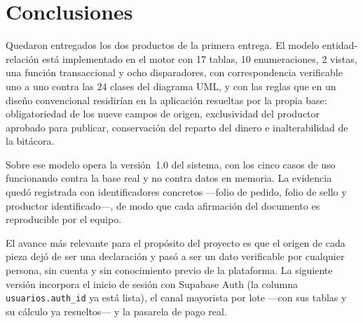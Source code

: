\documentclass[conference,letterpaper,onecolumn]{IEEEtran}
\begin{document}
\section{Conclusiones}

Quedaron entregados los dos productos de la primera entrega. El modelo
entidad-relación está implementado en el motor con 17 tablas, 10 enumeraciones, 2
vistas, una función transaccional y ocho disparadores, con correspondencia
verificable uno a uno contra las 24 clases del diagrama UML, y con las reglas que en
un diseño convencional residirían en la aplicación resueltas por la propia base:
obligatoriedad de los nueve campos de origen, exclusividad del productor aprobado
para publicar, conservación del reparto del dinero e inalterabilidad de la bitácora.

Sobre ese modelo opera la versión~1.0 del sistema, con los cinco casos de uso
funcionando contra la base real y no contra datos en memoria. La evidencia quedó
registrada con identificadores concretos ---folio de pedido, folio de sello y
productor identificado---, de modo que cada afirmación del documento es
reproducible por el equipo.

El avance más relevante para el propósito del proyecto es que el origen de cada
pieza dejó de ser una declaración y pasó a ser un dato verificable por cualquier
persona, sin cuenta y sin conocimiento previo de la plataforma. La siguiente
versión incorpora el inicio de sesión con Supabase Auth (la columna
\texttt{usuarios.auth\_id} ya está lista), el canal mayorista por lote —con sus
tablas y su cálculo ya resueltos— y la pasarela de pago real.
\end{document}
